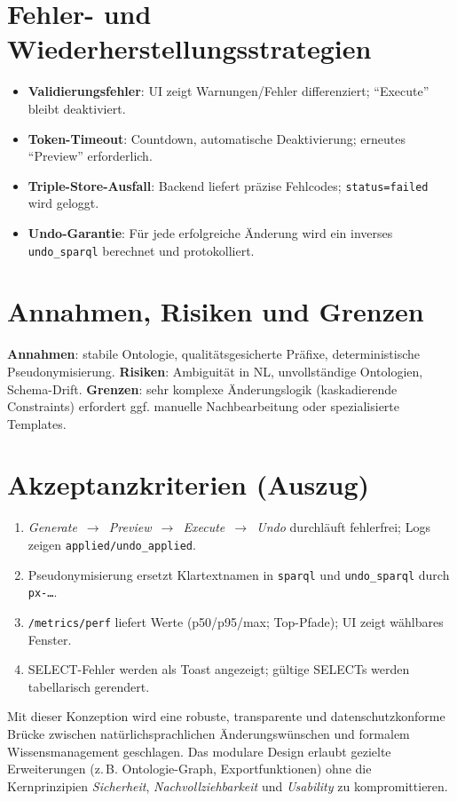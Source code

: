 \section{Fehler- und Wiederherstellungsstrategien}
\begin{itemize}
  \item \textbf{Validierungsfehler}: UI zeigt Warnungen/Fehler differenziert; \enquote{Execute} bleibt deaktiviert.
  \item \textbf{Token-Timeout}: Countdown, automatische Deaktivierung; erneutes \enquote{Preview} erforderlich.
  \item \textbf{Triple-Store-Ausfall}: Backend liefert präzise Fehlcodes; \texttt{status=failed} wird geloggt.
  \item \textbf{Undo-Garantie}: Für jede erfolgreiche Änderung wird ein inverses \texttt{undo\_sparql} berechnet und protokolliert.
\end{itemize}

\section{Annahmen, Risiken und Grenzen}
\textbf{Annahmen}: stabile Ontologie, qualitätsgesicherte Präfixe, deterministische Pseudonymisierung. \textbf{Risiken}: Ambiguität in NL, unvollständige Ontologien, Schema-Drift. \textbf{Grenzen}: sehr komplexe Änderungslogik (kaskadierende Constraints) erfordert ggf. manuelle Nachbearbeitung oder spezialisierte Templates.

\section{Akzeptanzkriterien (Auszug)}
\begin{enumerate}
  \item \emph{Generate~$\rightarrow$~Preview~$\rightarrow$~Execute~$\rightarrow$~Undo} durchläuft fehlerfrei; Logs zeigen \texttt{applied/undo\_applied}.
  \item Pseudonymisierung ersetzt Klartextnamen in \texttt{sparql} und \texttt{undo\_sparql} durch \texttt{px-\ldots}.
  \item \texttt{/metrics/perf} liefert Werte (p50/p95/max; Top-Pfade); UI zeigt wählbares Fenster.
  \item SELECT-Fehler werden als Toast angezeigt; gültige SELECTs werden tabellarisch gerendert.
\end{enumerate}

\medskip
Mit dieser Konzeption wird eine robuste, transparente und datenschutzkonforme Brücke zwischen natürlichsprachlichen Änderungswünschen und formalem Wissensmanagement geschlagen. Das modulare Design erlaubt gezielte Erweiterungen (z.\,B. Ontologie-Graph, Exportfunktionen) ohne die Kernprinzipien \emph{Sicherheit}, \emph{Nachvollziehbarkeit} und \emph{Usability} zu kompromittieren.




